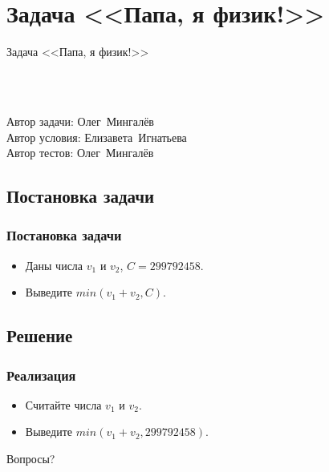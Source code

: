 \section{Задача <<Папа, я физик!>>}


\begin{frame}
    \begin{center}
        \Huge Задача <<Папа, я физик!>>
    \end{center}
    ~\\~\\
    \begin{center}
        Автор задачи: Олег~Мингалёв\\
        Автор условия: Елизавета~Игнатьева\\
        Автор тестов: Олег~Мингалёв
    \end{center}
\end{frame}

\subsection{Постановка задачи}

\begin{frame}
    \frametitle{Постановка задачи}

    \begin{itemize}
        \item Даны числа $v_1$ и $v_2$, $C = 299792458$.
        \item Выведите $min(v_1+v_2, C)$.
    \end{itemize}
\end{frame}

\subsection{Решение}

\begin{frame}
    \frametitle{Реализация}

    \begin{itemize}
        \item Считайте числа $v_1$ и $v_2$.
        \item Выведите $min(v_1+v_2, 299792458)$.
    \end{itemize}
\end{frame}

\begin{frame}
    \begin{center}
        \Huge Вопросы?
    \end{center}
\end{frame}

